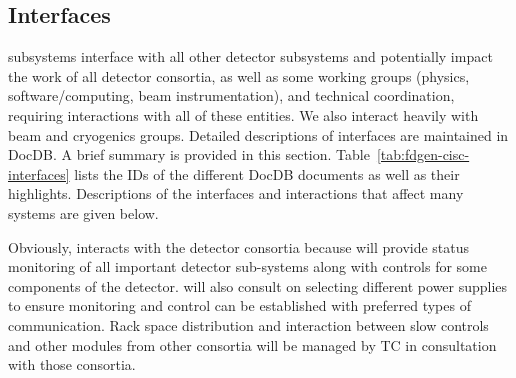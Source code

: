 \subsection{Interfaces}  %
\label{sec:interfaces}

 subsystems interface with all other detector subsystems and potentially impact the work of all detector consortia, as well as some
working groups (physics, software/computing, beam instrumentation), and technical coordination, requiring interactions with all of these entities.  We also interact heavily with  beam and cryogenics groups.  
Detailed descriptions of  interfaces are maintained in  DocDB. A brief summary is provided in this section. Table~\ref{tab:fdgen-cisc-interfaces} lists the IDs of the different DocDB documents as well as their highlights. Descriptions of the interfaces and interactions that affect many systems are given below. 

Obviously,  interacts with the detector consortia because  will provide status monitoring of all important detector sub-systems along with controls for some components of the detector.
 will also consult on selecting different power supplies to ensure monitoring and control can be established with preferred types of communication. 
Rack space distribution and interaction between slow controls and other modules from other consortia will be managed by TC in consultation with those consortia. 

